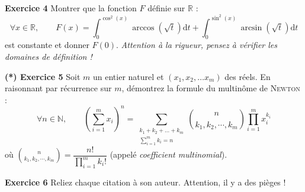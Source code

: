 \documentclass[french,bookmarks]{article}
\begin{document}
    \noindent \textbf{Exercice 4} Montrer que la fonction $F$ définie sur $\mathbb{R}$  :
    \[ \forall x \in \mathbb{R},\qquad F\left(x\right) = \int_0^{\cos^2\left(x\right)} \arccos\left(\sqrt{t}\right)\mathrm{d}t + \int_0^{\sin^2\left(x\right)} \arcsin\left(\sqrt{t}\right)\mathrm{d}t\]
    est constante et donner $F\left(0\right)$. \textit{Attention à la rigueur, pensez à vérifier les domaines de définition !}
    
    \vspace{40mm}
    
    \noindent \textbf{(*) Exercice 5} Soit $m$ un entier naturel et $\left(x_1, x_2, \dots x_m\right)$ des réels. En raisonnant par récurrence sur $m$, démontrez la formule du multinôme de \textsc{Newton} :
    \[ \forall n \in \mathbb{N},\qquad \left(\sum_{i=1}^m x_i \right)^n = \sum_{\substack{k_1 + k_2 + \dots + k_m\\\sum_{i=1}^m k_i = n}} \binom{n}{k_1,k_2,\cdots,k_m}\prod_{i=1}^m x_i^{k_i}\]
    où $\displaystyle \binom{n}{k_1,k_2,\cdots,k_m} = \dfrac{n!}{\displaystyle\prod_{i=1}^m k_i!}$ (appelé \textit{coefficient multinomial}).
    
    \newpage
    
    \noindent \textbf{Exercice 6} Reliez chaque citation à son auteur. Attention, il y a des pièges !\\
    
\end{document}
